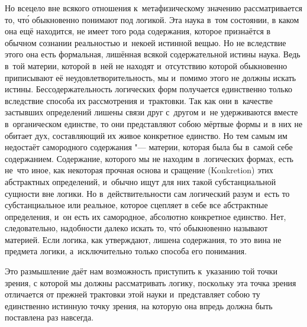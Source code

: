 Но всецело вне всякого отношения к~метафизическому значению рассматривается
то, чт\'{о} обыкновенно понимают под логикой. Эта наука в~том состоянии, в
каком она ещё находится, не имеет того рода содержания, которое признаётся
в обычном сознании реальностью и~некоей истинной вещью. Но не вследствие
этого она есть формальная, лишённая всякой содержательной истины наука.
Ведь в~той материи, которой в~ней не находят и~отсутствию которой
обыкновенно приписывают её неудовлетворительность, мы и~помимо этого не
должны искать истины. Бессодержательность логических форм получается
единственно только вследствие способа их рассмотрения и~трактовки. Так как
они в~качестве застывших определений лишены связи друг с~другом и~не
удерживаются вместе в~органическом единстве, то они представляют собою
мёртвые формы и~в них не обитает дух, составляющий их живое конкретное
единство. Но тем самым им недостаёт самородного содержания "--- материи,
которая была бы в~самой себе содержанием. Содержание, которого мы не
находим в~логических формах, есть не~что иное, как некоторая прочная основа
и сращение (Konkretion) этих абстрактных определений, и~обычно ищут для них
такой субстанциальной сущности вне логики. Но в~действительности сам
логический разум и~есть то субстанциальное или реальное, которое сцепляет в
себе все абстрактные определения, и~он есть их самородное, абсолютно
конкретное единство. Нет, следовательно, надобности далеко искать то, чт\'{о}
обыкновенно называют материей. Если логика, как утверждают, лишена
содержания, то это вина не предмета логики, а~исключительно только способа
его понимания.

Это размышление даёт нам возможность приступить к~указанию той точки зрения,
с которой мы должны рассматривать логику, поскольку эта точка зрения
отличается от прежней трактовки этой науки и~представляет собою ту
единственно истинную точку зрения, на которую она впредь должна быть
поставлена раз навсегда.

